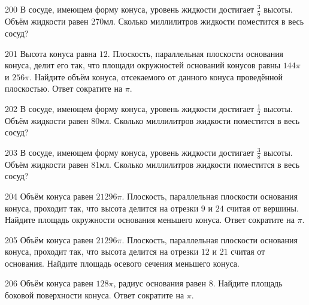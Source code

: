 \documentclass[a4paper]{article}
\begin{document}
\begin{taskBN}{200}
В сосуде, имеющем форму конуса, уровень жидкости достигает $\frac{3}{5}$ высоты. Объём жидкости равен 270мл. Сколько миллилитров жидкости поместится в весь сосуд?
\end{taskBN}

\begin{taskBN}{201}
Высота конуса равна $12$. Плоскость, параллельная плоскости основания конуса,  делит его так, что площади окружностей оснований конусов равны $144\pi$ и $256\pi$. Найдите объём конуса, отсекаемого от данного конуса проведённой плоскостью. Ответ сократите на $\pi$.
\end{taskBN}

\begin{taskBN}{202}
В сосуде, имеющем форму конуса, уровень жидкости достигает $\frac{1}{2}$ высоты. Объём жидкости равен 80мл. Сколько миллилитров жидкости поместится в весь сосуд?
\end{taskBN}

\begin{taskBN}{203}
В сосуде, имеющем форму конуса, уровень жидкости достигает $\frac{3}{8}$ высоты. Объём жидкости равен 81мл. Сколько миллилитров жидкости поместится в весь сосуд?
\end{taskBN}

\begin{taskBN}{204}
Объём конуса равен $21296\pi$. Плоскость, параллельная плоскости основания конуса,  проходит так, что высота делится на отрезки $9$ и $24$ считая от вершины. Найдите площадь окружности основания меньшего конуса. Ответ сократите на $\pi$.
\end{taskBN}

\begin{taskBN}{205}
Объём конуса равен $21296\pi$. Плоскость, параллельная плоскости основания конуса,  проходит так, что высота делится на отрезки $12$ и $21$ считая от основания. Найдите площадь осевого сечения меньшего конуса. 
\end{taskBN}

\begin{taskBN}{206}
Объём конуса равен $128\pi$, радиус основания равен $8$. Найдите площадь боковой поверхности конуса. Ответ сократите на $\pi$.
\end{taskBN}
\end{document}
